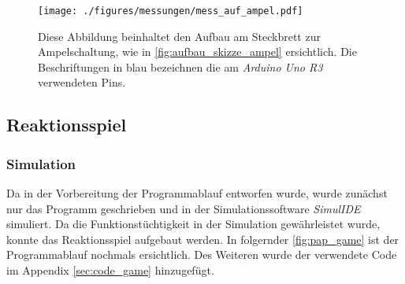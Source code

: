 \documentclass[12pt,english,ngerman]{scrartcl}
\begin{document}
\begin{figure}[H]
  \centering
  \texttt{[image: ./figures/messungen/mess\_auf\_ampel.pdf]}
  \caption{Diese Abbildung beinhaltet den Aufbau am Steckbrett zur Ampelschaltung, wie in \autoref{fig:aufbau_skizze_ampel} ersichtlich.
  Die Beschriftungen in blau bezeichnen die am \textit{Arduino Uno R3} verwendeten
  Pins.}
\label{fig:mess_wahrheitstabelle_jk}
\end{figure}






\subsection{Reaktionsspiel}
\subsubsection{Simulation}

Da in der Vorbereitung der Programmablauf entworfen wurde, wurde
zunächst nur das Programm geschrieben und in der Simulationssoftware
\textit{SimulIDE} simuliert. Da die Funktionstüchtigkeit in der
Simulation gewährleistet wurde, konnte das Reaktionsspiel aufgebaut
werden. In folgernder \autoref{fig:pap_game} ist der Programmablauf
nochmals ersichtlich. Des Weiteren wurde der verwendete Code im Appendix
\ref{sec:code_game} hinzugefügt.
\end{document}

